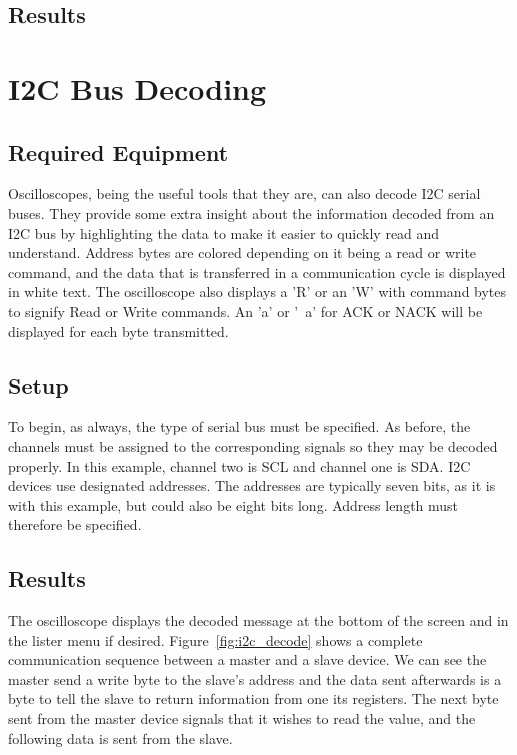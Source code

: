 \documentclass{article}
\begin{document}
  \subsection{Results}


  \section{I2C Bus Decoding}

  \subsection{Required Equipment}

  Oscilloscopes, being the useful tools that they are, can also decode I2C
  serial buses. They provide some extra insight about the information decoded
  from an I2C bus by highlighting the data to make it easier to quickly read and
  understand. Address bytes are colored depending on it being a read or write
  command, and the data that is transferred in a communication cycle is
  displayed in white text. The oscilloscope also displays a 'R' or an 'W' with
  command bytes to signify Read or Write commands. An 'a' or '~a' for ACK or
  NACK will be displayed for each byte transmitted.

  \subsection{Setup}

  To begin, as always, the type of serial bus must be specified. As before, the
  channels must be assigned to the corresponding signals so they may be decoded
  properly. In this example, channel two is SCL and channel one is SDA. I2C
  devices use designated addresses. The addresses are typically seven bits, as
  it is with this example, but could also be eight bits long. Address length
  must therefore be specified.

  \subsection{Results}

  The oscilloscope displays the decoded message at the bottom of the screen and
  in the lister menu if desired. Figure~\ref{fig:i2c_decode} shows a complete
  communication sequence between a master and a slave device. We can see the
  master send a write byte to the slave's address and the data sent afterwards
  is a byte to tell the slave to return information from one its registers. The
  next byte sent from the master device signals that it wishes to read the
  value, and the following data is sent from the slave.
\end{document}
